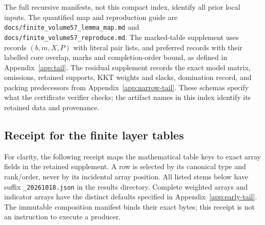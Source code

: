 \documentclass[11pt]{article}
\theoremstyle{remark}\newtheorem{remark}[theorem]{Remark}
\newcommand{\cert}[1]{\nolinkurl{#1}}
\begin{document}
\normalsize
The full recursive manifests, not this compact index, identify all prior
local inputs. The quantified map and reproduction guide are
\cert{docs/finite_volume57_lemma_map.md} and
\cert{docs/finite_volume57_reproduce.md}.
The marked-table supplement uses records $(b,m,X,P)$ with literal pair
lists, and preferred records with their labelled core overlap, marks and
completion-order bound, as defined in Appendix~\ref{app:tail}.
The residual supplement records the exact model matrix, omissions,
retained supports, KKT weights and slacks, domination record, and
packing predecessors from Appendix~\ref{app:narrow-tail}.
These schemas specify what the certificate verifier checks; the
artifact names in this index identify its retained data and provenance.

\subsection*{Receipt for the finite layer tables}

For clarity, the following receipt maps the mathematical table keys
to exact array fields in the retained supplement. A row is selected
by its canonical type and rank/order, never by its incidental array
position. All listed stems below have suffix
\cert{_20261018.json} in the results directory. Complete weighted
arrays and indicator arrays have the distinct defaults specified in
Appendix~\ref{app:early-tail}. The immutable composition manifest binds
their exact bytes; this receipt is not an instruction to execute a
producer.
\end{document}
